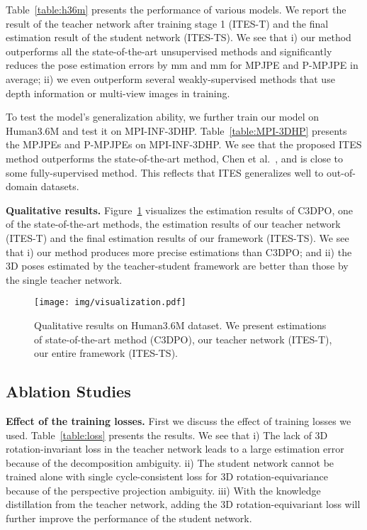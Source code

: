 \documentclass[letterpaper]{article} \usepackage{aaai21}  \usepackage{times}  \usepackage{helvet} \usepackage{courier}  \usepackage[hyphens]{url}  \usepackage{graphicx} \urlstyle{rm} \def\UrlFont{\rm}  \usepackage{natbib}  \usepackage{caption} \frenchspacing  \setlength{\pdfpagewidth}{8.5in}  \setlength{\pdfpageheight}{11in}
\begin{document}
Table~\ref{table:h36m} presents the performance of various models. We report the result of the teacher network after training stage 1 (ITES-T) and the final estimation result of the student network (ITES-TS). We see that i) our method outperforms all the state-of-the-art unsupervised methods and significantly reduces the pose estimation errors by  mm and  mm for MPJPE and P-MPJPE in average; ii) we even outperform several weakly-supervised methods that use depth information or multi-view images in training. 

To test the model's generalization ability, we further train our model on Human3.6M and test it on MPI-INF-3DHP. Table~\ref{table:MPI-3DHP} presents the MPJPEs and P-MPJPEs on MPI-INF-3DHP. We see that the proposed ITES method outperforms the state-of-the-art method, Chen et al.~\cite{chen2019unsupervised}, and is close to some fully-supervised method. This reflects that ITES generalizes well to out-of-domain datasets. 



\noindent\textbf{Qualitative results.} Figure~\ref{fig:visualization} visualizes the estimation results of C3DPO, one of the state-of-the-art methods, the estimation results of our teacher network (ITES-T) and the final estimation results of our framework (ITES-TS). We see that i) our method produces more precise estimations than C3DPO; and ii) the 3D poses estimated by the teacher-student framework are better than those by the single teacher network.

\begin{figure}[t] 
\centering
\texttt{[image: img/visualization.pdf]}
\vspace{-5mm}
\caption{\small Qualitative results on Human3.6M dataset. We present estimations of state-of-the-art method (C3DPO), our teacher network (ITES-T), our entire framework (ITES-TS).} 
\label{fig:visualization}
\end{figure}



\subsection{Ablation Studies}
\label{sec:ablation}

\textbf{Effect of the training losses.}
First we discuss the effect of training losses we used. Table~\ref{table:loss} presents the results. We see that i) The lack of 3D rotation-invariant loss in the teacher network leads to a large estimation error because of the decomposition ambiguity. ii) The student network cannot be trained alone with single cycle-consistent loss for 3D rotation-equivariance because of the perspective projection ambiguity. iii) With the knowledge distillation from the teacher network, adding the 3D rotation-equivariant loss will further improve the performance of the student network.
\end{document}

